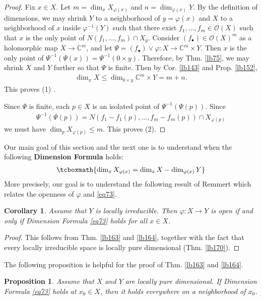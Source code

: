\documentclass[12pt,b5paper,notitlepage]{report}
\theoremstyle{definition}
\theoremstyle{plain}
\newtheorem{pp}[df]{Proposition}
\newtheorem{co}[df]{Corollary}
\newcommand{\scr}{\mathscr}
\newcommand{\blt}{\bullet}
\newcommand{\Cbb}{\mathbb C}
\numberwithin{equation}{section}
\begin{document}
\begin{proof}
Fix $x\in X$. Let $m=\dim_x X_{\varphi(x)}$ and $n=\dim_{\varphi(x)}Y$. By the definition of dimensions, we may shrink $Y$ to a neighborhood of $y=\varphi(x)$ and $X$ to a neighborhood of $x$ inside $\varphi^{-1}(Y)$ such that there exist $f_1,\dots,f_m\in\scr O(X)$ such that $x$ is the only point of $N(f_1,\dots,f_m)\cap X_y$. Consider $(f_\blt)\in\scr O(X)^m$ as a holomorphic map $X\rightarrow\Cbb^m$, and let $\Psi=(f_\blt)\vee\varphi:X\rightarrow \Cbb^m\times Y$. Then $x$ is the only point of $\Psi^{-1}(\Psi(x))=\Psi^{-1}(0\times y)$. Therefore, by Thm. \ref{lb75}, we may shrink $X$ and $Y$ further so that $\Psi$ is finite. Then by Cor. \ref{lb143} and Prop. \ref{lb152},
\begin{align*}
\dim_xX\leq\dim_{0\times y}\Cbb^m\times Y=m+n.
\end{align*}
This proves (1) .

Since $\Psi$ is finite, each $p\in X$ is an isolated point of $\Psi^{-1}(\Psi(p))$. Since
\begin{align*}
\Psi^{-1}(\Psi(p))=N(f_1-f_1(p),\dots,f_m-f_m(p))\cap X_{\varphi(p)}
\end{align*}
we must have $\dim_pX_{\varphi(p)}\leq m$. This proves (2).
\end{proof}

Our main goal of this section and the next one is to understand when the following \textbf{Dimension Formula} holds:
\begin{align}
\tcboxmath{\dim_x X_{\varphi(x)}=\dim_x X-\dim_{\varphi(x)} Y}\label{eq73}
\end{align}
More precisely, our goal is to understand the following result of Remmert which relates the openness of $\varphi$ and \eqref{eq73}.

\begin{co}\label{lb159}
Assume that $Y$ is locally irreducible. Then $\varphi:X\rightarrow Y$ is open if and only if Dimension Formula \eqref{eq73} holds for all $x\in X$.
\end{co}
\begin{proof}
This follows from Thm. \ref{lb163} and \ref{lb164}, together with the fact that every locally irreducible space is locally pure dimensional (Thm. \ref{lb170}).
\end{proof}



The following proposition is helpful for the proof of Thm. \ref{lb163} and \ref{lb164}.

\begin{pp}\label{lb160}
Assume that $X$ and $Y$ are locally pure dimensional. If Dimension Formula \eqref{eq73} holds at $x_0\in X$, then it holds everywhere on a neighborhood of $x_0$.
\end{pp}
\end{document}
